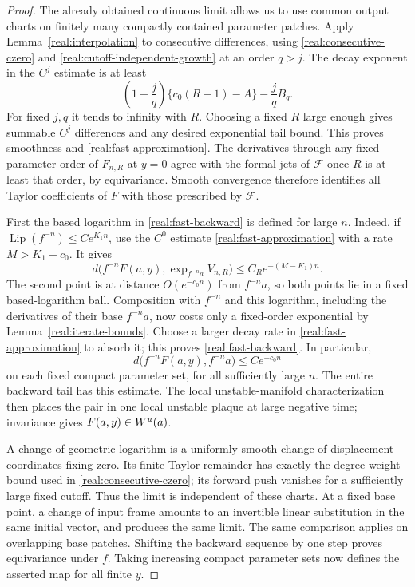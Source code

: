 \begin{proof}
The already obtained continuous limit allows us to use common
output charts on finitely many compactly contained parameter
patches. Apply Lemma~\ref{real:interpolation} to consecutive
differences, using \eqref{real:consecutive-czero} and
\eqref{real:cutoff-independent-growth} at an order $q>j$.
The decay exponent in the $C^j$ estimate is at least
\[
 \left(1-\frac jq\right)\{c_0(R+1)-A\}
          -\frac jq B_q.
\]
For fixed $j,q$ it tends to infinity with $R$. Choosing a fixed
$R$ large enough gives summable $C^j$ differences and any desired
exponential tail bound. This proves smoothness and
\eqref{real:fast-approximation}. The derivatives through any fixed
parameter order of $F_{n,R}$ at $y=0$ agree with the formal jets
of $\mathcal F$ once $R$ is at least that order, by equivariance.
Smooth convergence therefore identifies all Taylor coefficients
of $F$ with those prescribed by $\mathcal F$.

First the based logarithm in \eqref{real:fast-backward} is defined
for large $n$. Indeed, if $\operatorname{Lip}(f^{-n})\le Ce^{K_1n}$,
use the $C^0$ estimate \eqref{real:fast-approximation} with a rate
$M>K_1+c_0$. It gives
\[
 d\bigl(f^{-n}F(a,y),\exp_{f^{-n}a}V_{n,R}\bigr)
        \le C_R e^{-(M-K_1)n}.
\]
The second point is at distance $O(e^{-c_0n})$ from $f^{-n}a$,
so both points lie in a fixed based-logarithm ball. Composition
with $f^{-n}$ and this logarithm, including the derivatives of
their base $f^{-n}a$, now costs only a fixed-order exponential by
Lemma~\ref{real:iterate-bounds}. Choose a larger decay rate in
\eqref{real:fast-approximation} to absorb it; this proves
\eqref{real:fast-backward}. In particular,
\[
 d\bigl(f^{-n}F(a,y),f^{-n}a\bigr)\le C e^{-c_0n}
\]
on each fixed compact parameter set, for all sufficiently large
$n$. The entire backward tail has this estimate. The local
unstable-manifold characterization then places the pair in one
local unstable plaque at large negative time; invariance gives
$F(a,y)\in W^u(a)$.

A change of geometric logarithm is a uniformly smooth change of
displacement coordinates fixing zero. Its finite Taylor remainder
has exactly the degree-weight bound used in
\eqref{real:consecutive-czero}; its forward push vanishes for a
sufficiently large fixed cutoff. Thus the limit is independent
of these charts. At a fixed base point, a change of input frame
amounts to an invertible linear substitution in the same initial
vector, and produces the same limit. The same comparison applies
on overlapping base patches. Shifting the backward sequence by
one step proves equivariance under $f$. Taking increasing compact
parameter sets now defines the asserted map for all finite $y$.
\end{proof}

